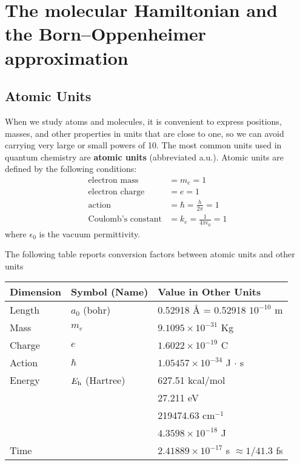 \documentclass[../Main/chem532-notes.tex]{subfiles}
\begin{document}
\chapter[The molecular Hamiltonian]{The molecular Hamiltonian and the Born--Oppenheimer approximation}

\section{Atomic Units}
When we study atoms and molecules, it is convenient to express positions, masses, and other properties in units that are close to one, so we can avoid carrying very large or small powers of 10.
The most common units used in quantum chemistry are \textbf{atomic units} (abbreviated a.u.). Atomic units are defined by the following conditions:
\begin{align}
\text{electron mass} & = m_e = 1\\
\text{electron charge} & = e = 1\\
\text{action} & = \hbar = \frac{h}{2\pi} = 1\\
\text{Coulomb's constant} & = k_e = \frac{1}{4\pi \epsilon_0} = 1
\end{align}
where $\epsilon_0$ is the vacuum permittivity.

The following table reports conversion factors between atomic units and other units 
\begin{table}[htbp]
\centering
\begin{tabular}{lll}
\toprule
Dimension & Symbol (Name) & Value in Other Units\\
\midrule
Length & $a_0$ (bohr) & 0.52918 \AA{} = 0.52918 $10^{-10}$ m\\ 
Mass & $m_e$ & $9.1095 \times 10^{-31}$ Kg \\
Charge & $e$ & $1.6022 \times 10^{-19}$ C \\
Action & $\hbar$ & $1.05457 \times 10^{-34}$ J $\cdot$ s \\
Energy & $E_{\rm h}$ (Hartree) & 627.51 kcal/mol \\
& & 27.211 eV \\
& & 219474.63 cm$^{-1}$ \\
& & $4.3598 \times 10^{-18}$ J\\
Time & & $2.41889 \times 10^{-17}$ s $\approx 1/41.3$ fs\\
\bottomrule
\end{tabular}
\label{tab:atomicunits}
\end{table}
\end{document}
